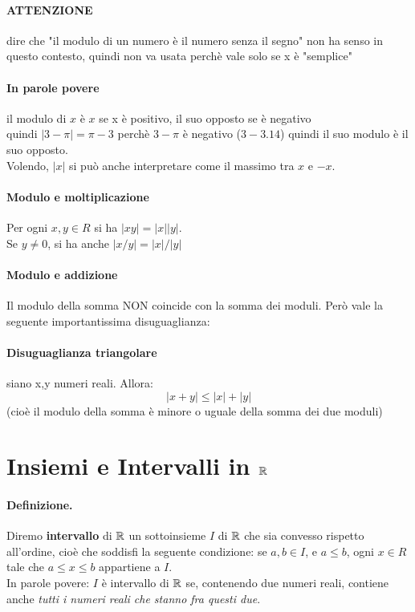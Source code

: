 \documentclass[12pt, a4paper, openany]{book}
\begin{document}
\paragraph{ATTENZIONE} dire che "il modulo di un numero è il numero senza il segno" non ha senso in questo contesto, quindi non va usata perchè vale solo se x è "semplice"
\paragraph{In parole povere} il modulo di $x$ è $x$ se x è positivo, il suo opposto se è negativo\\
quindi $|3 - \pi| = \pi - 3$ perchè $3-\pi$ è negativo ($3 - 3.14$) quindi il suo modulo è il suo opposto.
\\Volendo, $|x|$ si può anche interpretare come il massimo tra $x$ e $-x$.

\paragraph{Modulo e moltiplicazione}
Per ogni $x, y \in R$ si ha $|xy| = |x||y|$.\\Se $y\neq0$, si ha anche $|x/y|=|x|/|y|$
\paragraph{Modulo e addizione}
Il modulo della somma NON coincide con la somma dei moduli. Però vale la seguente importantissima disuguaglianza:
\paragraph{Disuguaglianza triangolare} siano x,y numeri reali. Allora:
\begin{equation}
    |x+y| \leq |x| + |y|
\end{equation} 
(cioè il modulo della somma è minore o uguale della somma dei due moduli)

\section{Insiemi e Intervalli in $\mathbb{R}$}
\paragraph{Definizione.} Diremo \textbf{intervallo} di $\mathbb{R}$ un sottoinsieme $I$ di $\mathbb{R}$ che sia convesso rispetto all'ordine, cioè che soddisfi la seguente condizione: se $a,b \in I$, e $a \leq b$, ogni $x\in R$ tale che $a \leq x \leq b$ appartiene a $I$. 
\\In parole povere: $I$ è intervallo di $\mathbb{R}$ se, contenendo due numeri reali, contiene anche \emph{tutti i numeri reali che stanno fra questi due}.
\end{document}
